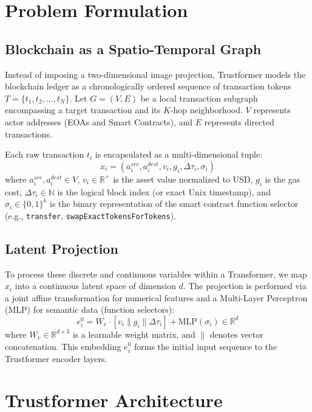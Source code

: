 \documentclass[conference,10pt]{IEEEtran}
\begin{document}
\section{Problem Formulation}

\subsection{Blockchain as a Spatio-Temporal Graph}
Instead of imposing a two-dimensional image projection, Trustformer models the blockchain ledger as a chronologically ordered sequence of transaction tokens $T = \{t_1, t_2, \dots, t_N\}$. Let $G = (V, E)$ be a local transaction subgraph encompassing a target transaction and its $K$-hop neighborhood. $V$ represents actor addresses (EOAs and Smart Contracts), and $E$ represents directed transactions.

Each raw transaction $t_i$ is encapsulated as a multi-dimensional tuple:
\begin{equation}
x_i = \left( a_i^{src}, a_i^{dest}, v_i, g_i, \Delta\tau_i, \sigma_i \right)
\end{equation}
where $a_i^{src}, a_i^{dest} \in V$, $v_i \in \mathbb{R}^+$ is the asset value normalized to USD, $g_i$ is the gas cost, $\Delta\tau_i \in \mathbb{N}$ is the logical block index (or exact Unix timestamp), and $\sigma_i \in \{0,1\}^k$ is the binary representation of the smart contract function selector (e.g., \texttt{transfer}, \texttt{swapExactTokensForTokens}).

\subsection{Latent Projection}
To process these discrete and continuous variables within a Transformer, we map $x_i$ into a continuous latent space of dimension $d$. The projection is performed via a joint affine transformation for numerical features and a Multi-Layer Perceptron (MLP) for semantic data (function selectors):
\begin{equation}
e_i^0 = W_v \cdot [v_i \parallel g_i \parallel \Delta\tau_i] + \text{MLP}(\sigma_i) \in \mathbb{R}^d
\end{equation}
where $W_v \in \mathbb{R}^{d \times 3}$ is a learnable weight matrix, and $\parallel$ denotes vector concatenation. This embedding $e_i^0$ forms the initial input sequence to the Trustformer encoder layers.

\section{Trustformer Architecture}
\end{document}
